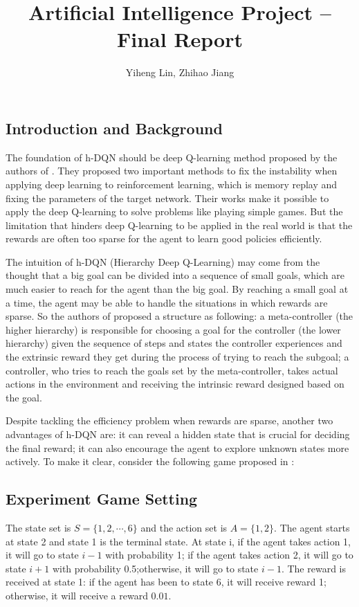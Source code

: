 \documentclass{article}
\title{\textmd{\bf Artificial Intelligence Project -- Final Report}}
\date{}
\author{Yiheng Lin, Zhihao Jiang}
\begin{document}
    \begin{spacing}{1.1}
    \maketitle %

    \section{Introduction and Background}
    The foundation of h-DQN should be deep Q-learning method proposed by the authors of \cite{AI-15}. They proposed two important methods to fix the instability when applying deep learning to reinforcement learning, which is memory replay and fixing the parameters of the target network. Their works make it possible to apply the deep Q-learning to solve problems like playing simple games. But the limitation that hinders deep Q-learning to be applied in the real world is that the rewards are often too sparse for the agent to learn good policies efficiently.

    The intuition of h-DQN (Hierarchy Deep Q-Learning) may come from the thought that a big goal can be divided into a sequence of small goals, which are much easier to reach for the agent than the big goal. By reaching a small goal at a time, the agent may be able to handle the situations in which rewards are sparse. So the authors of \cite{AI-16} proposed a structure as following: a meta-controller (the higher hierarchy) is responsible for choosing a goal for the controller (the lower hierarchy) given the sequence of steps and states the controller experiences and the extrinsic reward they get during the process of trying to reach the subgoal; a controller, who tries to reach the goals set by the meta-controller, takes actual actions in the environment and receiving the intrinsic reward designed based on the goal.

    Despite tackling the efficiency problem when rewards are sparse, another two advantages of h-DQN are: it can reveal a hidden state that is crucial for deciding the final reward; it can also encourage the agent to explore unknown states more actively. To make it clear, consider the following game proposed in \cite{AI-16}:

    \subsection{Experiment Game Setting}\label{game1}
    The state set is $S = \{1, 2, \cdots, 6\}$ and the action set is $A = \{1, 2\}$. The agent starts at state 2 and state 1 is the terminal state. At state i, if the agent takes action 1, it will go to state $i-1$ with probability 1; if the agent takes action 2, it will go to state $i+1$ with probability 0.5;otherwise, it will go to state $i-1$. The reward is received at state 1: if the agent has been to state 6, it will receive reward 1; otherwise, it will receive a reward $0.01$.


\end{spacing}
\end{document}
